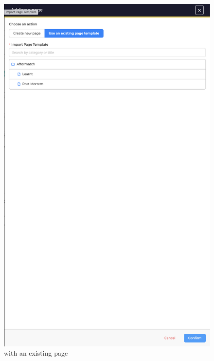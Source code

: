 \begin{figure}[H]
    \centering
    \includegraphics[width=\textwidth]{images/docs/analyst/cases/addition/adding_a_existng_page.png}
    \caption{with an existing page}
    \label{fig:modules}
\end{figure}